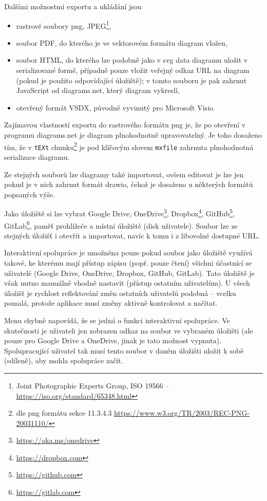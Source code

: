 Dalšími možnostmi exportu a ukládání jsou
\begin{itemize}
  \item rastrové soubory \acrshort{png}, JPEG\footnote{Joint Photographic Experts Group, ISO 19566 -- \url{https://iso.org/standard/65348.html}},
  \item soubor PDF, do kterého je ve vektorovém formátu diagram vložen,
  \item soubor HTML, do kterého lze podobně jako v \acrshort{svg} data diagramu uložit v serializované formě, případně pouze vložit veřejný odkaz URL na diagram (pokud je použito odpovídající úložiště);
        v tomto souboru je pak zahrnut JavaScript od diagrams.net, který diagram vykreslí,
  \item otevřený formát VSDX, původně vyvinutý pro Microsoft Visio.
\end{itemize}

Zajímavou vlastností exportu do rastrového formátu \acrshort{png} je, že po otevření v programu diagrams.net je diagram plnohodnotně upravovatelný.
Je toho dosaženo tím, že v \texttt{tEXt} chunku\footnote{dle \acrshort{png} formátu sekce 11.3.4.3 \url{https://www.w3.org/TR/2003/REC-PNG-20031110/}}
je pod klíčovým slovem \texttt{mxfile} zahrnuta plnohodnotná serializace diagramu.

Ze stejných souborů lze diagramy také importovat, ovšem editovat je lze jen pokud je v nich zahrnut formát drawio, čehož je dosaženo u některých formátů popsaných výše.

Jako úložiště si lze vybrat Google Drive,
OneDrive\footnote{\url{https://aka.ms/onedrive}},
Dropbox\footnote{\url{https://dropbox.com}},
GitHub\footnote{\url{https://github.com}},
Git\-Lab\footnote{\url{https://gitlab.com}},
paměť prohlížeče a místní úložiště (disk uživatele).
Soubor lze ze stejných úložišť i otevřít a importovat, navíc k tomu i z libovolné dostupné URL.

Interaktivní spolupráce je umožněna pouze pokud soubor jako úložiště využívá takové, ke kterému mají přístup zápisu (popř. pouze čtení) všichni účastnící se uživatelé (Google Drive, OneDrive, Dropbox, GitHub, GitLab).
Tato úložiště je však nutno manuálně vhodně nastavit (přístup ostatním uživatelům).
U všech úložišť je rychlost reflektování změn ostatních uživatelů podobná -- vcelku pomalá, protože aplikace musí změny aktivně kontrolovat a načítat.

Menu  chybně napovídá, že se jedná o funkci interaktivní spolupráce.
Ve skutečnosti je uživateli jen zobrazen odkaz na soubor ve vybraném úložišti (ale pouze pro Google Drive a OneDrive, jinak je tato možnost vypnuta).
Spolupracující uživatel tak musí tento soubor v daném úložišti uložit k sobě (sdíleně), aby mohla spolupráce začít.

